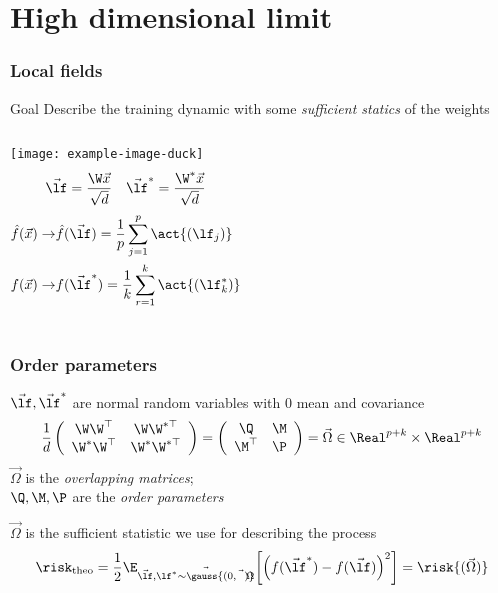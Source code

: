 \documentclass[handout]{beamer}
\begin{document}
\section{High dimensional limit}
\begin{frame}
  \frametitle{Local fields}
  \begin{block}{Goal}
    Describe the training dynamic with some \emph{sufficient statics} of the weights
  \end{block}
  \pause
  \vfill

  \begin{columns}
      \texttt{[image: example-image-duck]}
    \[
      \vec{\lf} = \frac{\W\vec{x}}{\sqrt{{d}}}\quad
      \vec{\lf}^{*} = \frac{\W^{*}\vec{x}}{\sqrt{{d}}}
    \]
    \[\begin{split}
        \hat{f}{(\vec{x})} \rightarrow& \hat{f}{(\vec{\lf})} = \frac{1}{p}\sum_{j=1}^{p} \act{\left(\lf_j\right)} \\
        f{(\vec{x})} \rightarrow& f{(\vec{\lf}^*)} = \frac{1}{k}\sum_{r=1}^{k} \act{\left(\lf^*_k\right)}
    \end{split}\]

  \end{columns}
\end{frame}

\begin{frame}
  \frametitle{Order parameters}
  \(\vec{\lf},\vec{\lf}^*\) are normal random variables with 0 mean and covariance
  \[
    \frac{1}{d}\left(\begin{array}{cc}\W\W^\top &  \W\W^{*\top}\\ \W^{*}\W^\top & \W^*\W^{*\top}\end{array}\right) =
    \left(\begin{array}{cc}\Q & \M \\ \M^{\top} & \P \end{array}\right) =
    \vec{\Omega} \in \Real^{p+k}\times\Real^{p+k}
  \]
  \(\vec{\Omega}\) is the \emph{overlapping matrices};\\
  \(\Q,\M,\P\) are the \emph{order parameters}
  \pause 

  \vfill
  \(\vec{\Omega}\) is the sufficient statistic we use for describing the process
  \[
    \risk_\text{theo}= \frac12\E_{\vec{\lf},\vec{\lf^* \sim \gauss{(0,\vec{\Omega})}}}
                              {\left[\left(f{(\vec{\lf}^*)} - f{(\vec{\lf})}\right)^2\right]} = \risk{(\vec{\Omega})}
  \]
\end{frame}
\end{document}
